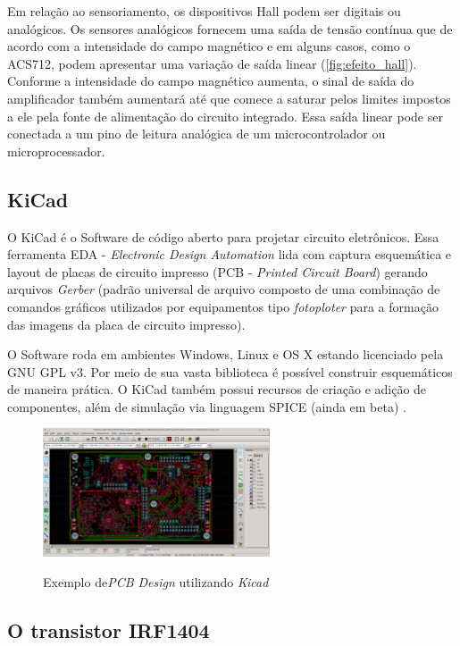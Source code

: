 Em relação ao sensoriamento, os dispositivos Hall podem ser digitais ou analógicos. Os sensores analógicos fornecem uma saída de tensão contínua que de acordo com a intensidade do campo magnético e em alguns casos, como o ACS712, podem apresentar uma variação de saída linear (\autoref{fig:efeito_hall}). Conforme a intensidade do campo magnético aumenta, o sinal de saída do amplificador também aumentará até que comece a saturar pelos limites impostos a ele pela fonte de alimentação do circuito integrado. Essa saída linear pode ser conectada a um pino de leitura analógica de um microcontrolador ou microprocessador.

\subsection{KiCad}

O KiCad é o Software de código aberto para projetar circuito eletrônicos. Essa ferramenta EDA - \textit{Electronic Design Automation} lida com captura esquemática e layout de placas de circuito impresso (PCB - \textit{Printed Circuit Board}) gerando arquivos \textit{Gerber} (padrão universal de arquivo composto de uma combinação de comandos gráficos utilizados por equipamentos tipo \textit{fotoploter} para a formação das imagens da placa de circuito impresso).

O Software roda em ambientes Windows, Linux e OS X estando licenciado pela GNU GPL v3. Por meio de sua vasta biblioteca é possível construir esquemáticos de maneira prática. O KiCad também possui recursos de criação e adição de componentes, além de simulação via linguagem SPICE (ainda em beta) \cite{Kicad}. 

\begin{figure}[H]
	\centering
	\caption{Exemplo de\textit{PCB Design} utilizando \textit{Kicad}}
	\includegraphics[width=0.6\textwidth]{figuras/kicad_pcbnew.png}
	\label{fig:kicad_pcbnew}
\end{figure} 

\subsection{O transistor IRF1404} 
